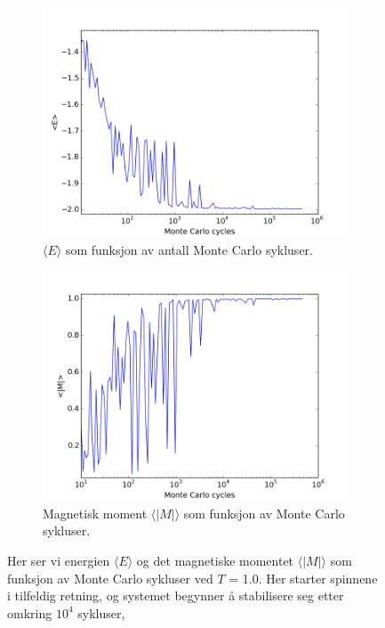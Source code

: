 \documentclass[11pt,a4paper]{article}
\begin{document}
\FloatBarrier
\begin{figure}[!ht]
\centering
\begin{subfigure}{.55\textwidth}
  \centering
  \includegraphics[width=1.1\linewidth]{4cT1randomE.png}
  \caption{$\langle E \rangle$ som funksjon av antall Monte Carlo sykluser. }
  \label{e2}
\end{subfigure}%
\begin{subfigure}{.55\textwidth}
  \centering
  \includegraphics[width=1.1\linewidth]{4cT1randomM.png}
  \caption{Magnetisk moment $\langle |M| \rangle$ som funksjon av Monte Carlo sykluser. }
  \label{m2}
\end{subfigure}
\caption{Her ser vi energien $\langle E \rangle$ og det magnetiske momentet $\langle |M| \rangle$ som funksjon av Monte Carlo sykluser ved $T$ = 1.0. Her starter spinnene i tilfeldig retning, og systemet begynner å stabilisere seg etter omkring $10^4$ sykluser,  }
\label{fig:T1rand}
\end{figure}
\FloatBarrier
\end{document}
